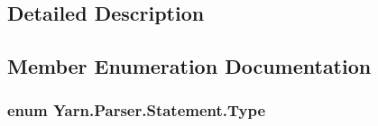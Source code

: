 \subsection{Detailed Description}


\subsection{Member Enumeration Documentation}
\hypertarget{a00076_a518000e4e6219ce5f9f4229f505cd944}{
\subsubsection[{Type}]{\setlength{\rightskip}{0pt plus 5cm}enum {\bf Yarn.\-Parser.\-Statement.\-Type}\hspace{0.3cm}{\ttfamily [package]}}}\label{a00076_a518000e4e6219ce5f9f4229f505cd944}
